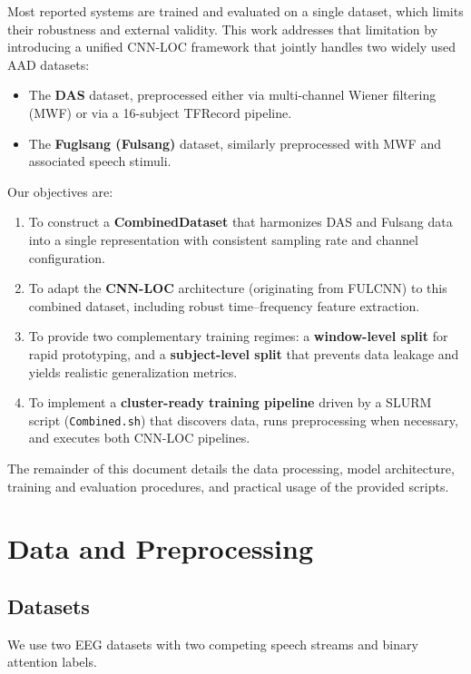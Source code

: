\documentclass[11pt,a4paper]{article}
\newcommand{\py}[1]{\texttt{#1}}
\begin{document}
Most reported systems are trained and evaluated on a single dataset, which limits their robustness and external validity. This work addresses that limitation by introducing a unified CNN-LOC framework that jointly handles two widely used AAD datasets:
\begin{itemize}
  \item The \textbf{DAS} dataset, preprocessed either via multi-channel Wiener filtering (MWF) or via a 16-subject TFRecord pipeline.
  \item The \textbf{Fuglsang (Fulsang)} dataset, similarly preprocessed with MWF and associated speech stimuli.
\end{itemize}

Our objectives are:
\begin{enumerate}
  \item To construct a \textbf{CombinedDataset} that harmonizes DAS and Fulsang data into a single representation with consistent sampling rate and channel configuration.
  \item To adapt the \textbf{CNN-LOC} architecture (originating from FULCNN) to this combined dataset, including robust time--frequency feature extraction.
  \item To provide two complementary training regimes: a \textbf{window-level split} for rapid prototyping, and a \textbf{subject-level split} that prevents data leakage and yields realistic generalization metrics.
  \item To implement a \textbf{cluster-ready training pipeline} driven by a SLURM script (\py{Combined.sh}) that discovers data, runs preprocessing when necessary, and executes both CNN-LOC pipelines.
\end{enumerate}

The remainder of this document details the data processing, model architecture, training and evaluation procedures, and practical usage of the provided scripts.

\section{Data and Preprocessing}
\label{sec:data}

\subsection{Datasets}
\label{sec:datasets}

We use two EEG datasets with two competing speech streams and binary attention labels.
\end{document}
